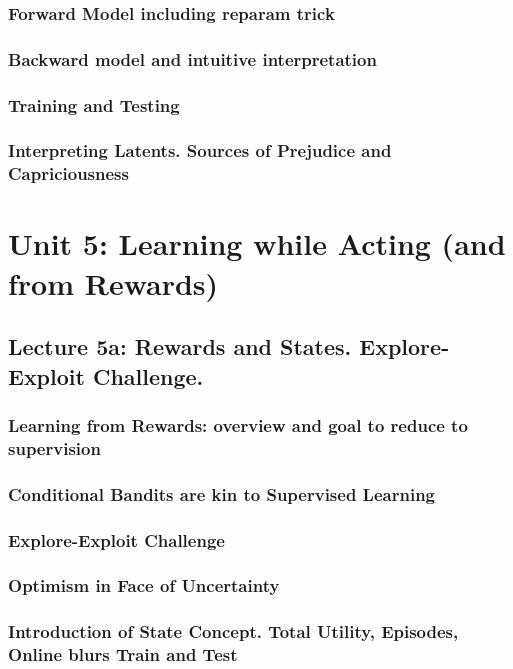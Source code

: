 \documentclass[12pt]{article}
\begin{document}
      \subsubsection*{Forward Model including reparam trick}
      \subsubsection*{Backward model and intuitive interpretation}
      \subsubsection*{Training and Testing}
      \subsubsection*{Interpreting Latents.  Sources of Prejudice and Capriciousness}
    \newpage

  \section*{\sc Unit 5: Learning while Acting (and from Rewards)}
    \subsection*{Lecture 5a: Rewards and States.  Explore-Exploit Challenge.}
      \subsubsection*{Learning from Rewards: overview and goal to reduce to supervision}
      \subsubsection*{Conditional Bandits are kin to Supervised Learning}
      \subsubsection*{Explore-Exploit Challenge}
      \subsubsection*{Optimism in Face of Uncertainty}
      \subsubsection*{Introduction of State Concept.  Total Utility, Episodes,  Online blurs Train and Test}
    \newpage
\end{document}
